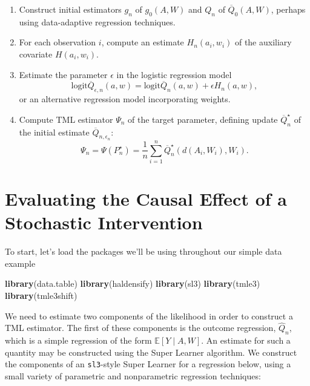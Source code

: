 \documentclass[12pt, krantz2,]{book}
\newenvironment{Shaded}{\begin{snugshade}}{\end{snugshade}}
\newcommand{\KeywordTok}[1]{\textcolor[rgb]{0.13,0.29,0.53}{\textbf{#1}}}
\newcommand{\NormalTok}[1]{#1}
\providecommand{\tightlist}{%
  \setlength{\itemsep}{0pt}\setlength{\parskip}{0pt}}
\theoremstyle{definition}
\theoremstyle{definition}
\theoremstyle{definition}
\newcommand{\E}{\mathbb{E}}
\newcommand{\1}{\mathbbm{1}}
\begin{document}
\begin{enumerate}
\def\labelenumi{\arabic{enumi}.}
\tightlist
\item
  Construct initial estimators \(g_n\) of \(g_0(A, W)\) and \(Q_n\) of
  \(\overline{Q}_0(A, W)\), perhaps using data-adaptive regression techniques.
\item
  For each observation \(i\), compute an estimate \(H_n(a_i, w_i)\) of the
  auxiliary covariate \(H(a_i,w_i)\).
\item
  Estimate the parameter \(\epsilon\) in the logistic regression model
  \[ \text{logit}\overline{Q}_{\epsilon, n}(a, w) =
  \text{logit}\overline{Q}_n(a, w) + \epsilon H_n(a, w),\]
  or an alternative regression model incorporating weights.
\item
  Compute TML estimator \(\Psi_n\) of the target parameter, defining update
  \(\overline{Q}_n^{\star}\) of the initial estimate
  \(\overline{Q}_{n, \epsilon_n}\):
  \begin{equation}
    \Psi_n = \Psi(P_n^{\star}) = \frac{1}{n} \sum_{i = 1}^n
    \overline{Q}_n^{\star}(d(A_i, W_i), W_i).
    \label{eq:tmle}
  \end{equation}
\end{enumerate}

\hypertarget{evaluating-the-causal-effect-of-a-stochastic-intervention}{%
\section{Evaluating the Causal Effect of a Stochastic Intervention}\label{evaluating-the-causal-effect-of-a-stochastic-intervention}}

To start, let's load the packages we'll be using throughout our simple data example

\begin{Shaded}
\begin{Highlighting}[]
\KeywordTok{library}\NormalTok{(data.table)}
\KeywordTok{library}\NormalTok{(haldensify)}
\KeywordTok{library}\NormalTok{(sl3)}
\KeywordTok{library}\NormalTok{(tmle3)}
\KeywordTok{library}\NormalTok{(tmle3shift)}
\end{Highlighting}
\end{Shaded}

We need to estimate two components of the likelihood in order to construct a TML
estimator. The first of these components is the outcome regression, \(\hat{Q}_n\),
which is a simple regression of the form \(\E[Y \mid A,W]\). An estimate
for such a quantity may be constructed using the Super Learner algorithm. We
construct the components of an \texttt{sl3}-style Super Learner for a regression below,
using a small variety of parametric and nonparametric regression techniques:
\end{document}
